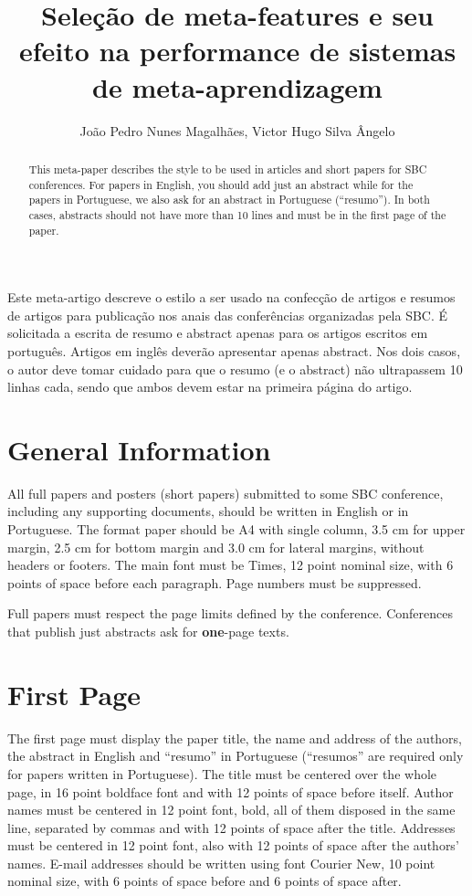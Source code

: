 \documentclass[12pt]{article}
\title{Seleção de meta-features e seu efeito na performance de sistemas de meta-aprendizagem}
\author{João Pedro Nunes Magalhães\inst{1}, Victor Hugo Silva Ângelo\inst{1}}
\begin{document}
 

\maketitle

\begin{abstract}
  This meta-paper describes the style to be used in articles and short papers
  for SBC conferences. For papers in English, you should add just an abstract
  while for the papers in Portuguese, we also ask for an abstract in
  Portuguese (``resumo''). In both cases, abstracts should not have more than
  10 lines and must be in the first page of the paper.
\end{abstract}
     
\begin{resumo} 
  Este meta-artigo descreve o estilo a ser usado na confecção de artigos e
  resumos de artigos para publicação nos anais das conferências organizadas
  pela SBC. É solicitada a escrita de resumo e abstract apenas para os artigos
  escritos em português. Artigos em inglês deverão apresentar apenas abstract.
  Nos dois casos, o autor deve tomar cuidado para que o resumo (e o abstract)
  não ultrapassem 10 linhas cada, sendo que ambos devem estar na primeira
  página do artigo.
\end{resumo}

\section{General Information}

All full papers and posters (short papers) submitted to some SBC conference,
including any supporting documents, should be written in English or in
Portuguese. The format paper should be A4 with single column, 3.5 cm for upper
margin, 2.5 cm for bottom margin and 3.0 cm for lateral margins, without
headers or footers. The main font must be Times, 12 point nominal size, with 6
points of space before each paragraph. Page numbers must be suppressed.

Full papers must respect the page limits defined by the conference.
Conferences that publish just abstracts ask for \textbf{one}-page texts.

\section{First Page} \label{sec:firstpage}

The first page must display the paper title, the name and address of the
authors, the abstract in English and ``resumo'' in Portuguese (``resumos'' are
required only for papers written in Portuguese). The title must be centered
over the whole page, in 16 point boldface font and with 12 points of space
before itself. Author names must be centered in 12 point font, bold, all of
them disposed in the same line, separated by commas and with 12 points of
space after the title. Addresses must be centered in 12 point font, also with
12 points of space after the authors' names. E-mail addresses should be
written using font Courier New, 10 point nominal size, with 6 points of space
before and 6 points of space after.
\end{document}
